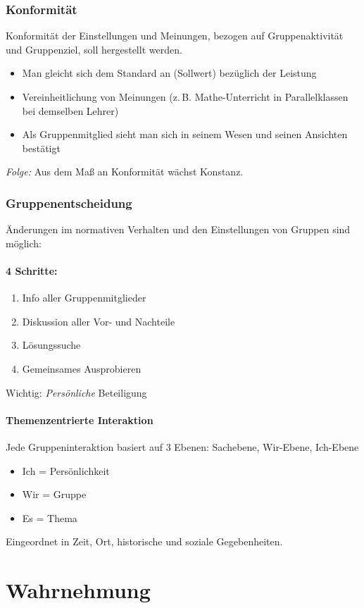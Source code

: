 \documentclass[12pt]{scrartcl}
\DeclareRobustCommand{\zB}{z.\,B.\xspace}
\begin{document}
\subsubsection{Konformität}
Konformität der Einstellungen und Meinungen, bezogen auf Gruppenaktivität und
Gruppenziel, soll hergestellt werden.
\begin{itemize}
	\item Man gleicht sich dem Standard an (Sollwert) bezüglich der Leistung
	\item Vereinheitlichung von Meinungen (\zB Mathe-Unterricht in
		Parallelklassen bei demselben Lehrer)
	\item Als Gruppenmitglied sieht man sich in seinem Wesen und seinen
		Ansichten bestätigt
\end{itemize}
\emph{Folge:} Aus dem Maß an Konformität wächst Konstanz.

\subsubsection{Gruppenentscheidung}
Änderungen im normativen Verhalten und den Einstellungen von Gruppen sind
möglich:
\paragraph{4 Schritte:}
\begin{enumerate}
	\item Info aller Gruppenmitglieder
	\item Diskussion aller Vor- und Nachteile
	\item Lösungssuche
	\item Gemeinsames Ausprobieren
\end{enumerate}
Wichtig: \emph{Persönliche} Beteiligung

\paragraph{Themenzentrierte Interaktion}
Jede Gruppeninteraktion basiert auf 3 Ebenen: Sachebene, Wir-Ebene, Ich-Ebene
\begin{itemize}
	\item Ich = Persönlichkeit
	\item Wir = Gruppe
	\item Es = Thema
\end{itemize}
Eingeordnet in Zeit, Ort, historische und soziale Gegebenheiten.

\section{Wahrnehmung}
\end{document}
